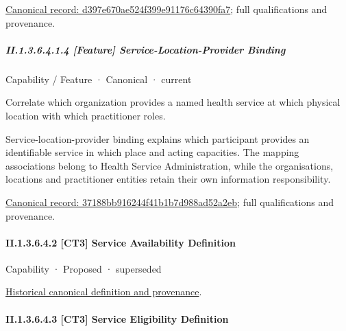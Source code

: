 {\footnotesize \href{../../../../continuum/strategy/capability/feature/d397e670ae524f399e91176c64390fa7.md}{Canonical record: d397e670ae524f399e91176c64390fa7}; full qualifications and provenance.}\par
\subparagraph*{II.1.3.6.4.1.4 [Feature] Service-Location-Provider Binding}
\label{navigation:II.1.3.6.4.1.4}

\label{element:37188bb916244f41b1b7d988ad52a2eb}
{\small Capability / Feature · Canonical · current}\par

Correlate which organization provides a named health service at which physical location with which practitioner roles.



Service-location-provider binding explains which participant provides an identifiable service in which place and acting capacities. The mapping associations belong to Health Service Administration, while the organisations, locations and practitioner entities retain their own information responsibility.


{\footnotesize \href{../../../../continuum/strategy/capability/feature/37188bb916244f41b1b7d988ad52a2eb.md}{Canonical record: 37188bb916244f41b1b7d988ad52a2eb}; full qualifications and provenance.}\par
\paragraph*{II.1.3.6.4.2 [CT3] Service Availability Definition}
\label{navigation:II.1.3.6.4.2}

\label{element:9e5329a42f964199b4b0a87ab1cacc2e}
{\small Capability · Proposed · superseded}\par
\href{../../../../continuum/strategy/capability/9e5329a42f964199b4b0a87ab1cacc2e.md}{Historical canonical definition and provenance}.\par
\paragraph*{II.1.3.6.4.3 [CT3] Service Eligibility Definition}
\label{navigation:II.1.3.6.4.3}

